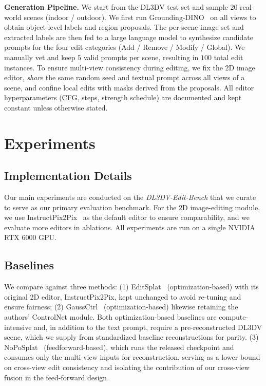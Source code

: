 \documentclass[10pt,twocolumn,letterpaper]{article}
\newcommand{\ourbench}{\textit{DL3DV-Edit-Bench}}
\begin{document}
\vspace{1mm}
\noindent\textbf{Generation Pipeline.}
We start from the DL3DV test set and sample $20$ real-world scenes (indoor / outdoor). We first run Grounding-DINO~\cite{liu2024groundingdinomarryingdino} on all views to obtain object-level labels and region proposals. The per-scene image set and extracted labels are then fed to a large language model to synthesize candidate prompts for the four edit categories (Add / Remove / Modify / Global). 
We manually vet and keep $5$ valid prompts per scene, resulting in $100$ total edit instances. To ensure multi-view consistency during editing, we fix the 2D image editor, \emph{share} the same random seed and textual prompt across all views of a scene, and confine local edits with masks derived from the proposals. All editor hyperparameters (CFG, steps, strength schedule) are documented and kept constant unless otherwise stated.



\section{Experiments}

\subsection{Implementation Details}
Our main experiments are conducted on the {\ourbench} that we curate to serve as our primary evaluation benchmark. 
For the 2D image-editing module, we use InstructPix2Pix~\cite{ip2p} as the default editor to ensure comparability, and we evaluate more editors in ablations. All experiments are run on a single NVIDIA RTX 6000 GPU.


\subsection{Baselines}
We compare against three methods: (1) EditSplat~\cite{lee2025editsplatmultiviewfusionattentionguided} (optimization-based) with its original 2D editor, InstructPix2Pix, kept unchanged to avoid re-tuning and ensure fairness; (2) GaussCtrl~\cite{gaussctrl} (optimization-based) likewise retaining the authors’ ControlNet module. Both optimization-based baselines are compute-intensive and, in addition to the text prompt, require a pre-reconstructed DL3DV scene, which we supply from standardized baseline reconstructions for parity. (3) NoPoSplat~\cite{noposplat} (feedforward-based), which runs the released checkpoint and consumes only the multi-view inputs for reconstruction, serving as a lower bound on cross-view edit consistency and isolating the contribution of our cross-view fusion in the feed-forward design.
\end{document}
